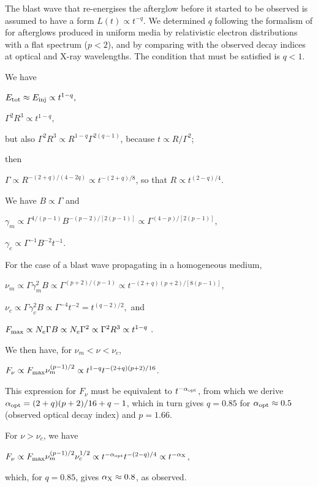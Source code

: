\documentclass[fleqn,usenatbib]{mnras}
\begin{document}
The blast wave that re-energises the afterglow before it started to be observed is assumed to have a form $L(t) \propto t^{-q}$. We determined $q$ following the formalism of  \citep{Dai01} for afterglows produced  in uniform media by relativistic electron distributions with a flat spectrum ($p < 2$), and by comparing with the observed decay indices at optical and X-ray wavelengths. The condition that must be satisfied is $q < 1$.  

We have

$E_{\rm tot} \approx E_{\rm inj} \propto t^{1 - q},$

$\Gamma^2 R^3 \propto t^{1 - q},$

\noindent
but also $\Gamma^2 R^3 \propto R^{1 - q} \Gamma^{2(q - 1)}$, because $t \propto R/\Gamma^2$;

\noindent
then

$\Gamma \propto R^{-(2+q)/(4-2q)} \propto t^{-(2+q)/8}$, so that $R \propto t^{(2-q)/4}$.

\noindent
We have $B \propto \Gamma$ and

$\gamma_m \propto \Gamma^{1/(p-1)} B^{-(p-2)/[2(p-1)]} \propto \Gamma^{(4-p)/[2(p-1)]}$,

$\gamma_c \propto \Gamma^{-1} B^{-2} t^{-1}$.

\noindent
For the case of a blast wave propagating in a homogeneous medium,

$\nu_m \propto \Gamma \gamma_m^2 B \propto \Gamma^{(p+2)/(p-1)} \propto t^{-(2+q)(p+2)/[8(p-1)]},$

$\nu_c \propto \Gamma \gamma_c^2 B \propto \Gamma^{-4} t^{-2} = t^{(q-2)/2},$ and

$F_{\rm max} \propto N_e \Gamma B \propto N_e \Gamma^2 \propto \Gamma^2 R^3 \propto t^{1 - q}$ .

\noindent
We then have, for $\nu_m < \nu < \nu_c$,

$F_{\nu} \propto F_{\rm max} \nu_m^{(p-1)/2} \propto t^{1 - q} t^{-(2+q)(p+2)/16}$.

\noindent
This expression for $F_{\nu}$ must be equivalent to $t^{-\alpha_{\rm opt}}$, 
from which we derive $\alpha_{\rm opt} = (2+q)(p+2)/16 + q - 1$, which in turn gives $q = 0.85$ for $\alpha_{\rm opt} \approx 0.5$ (observed optical decay index) and $p = 1.66$.

For $\nu > \nu_c$, we have 

$F_{\nu} \propto F_{\rm max} \nu_m^{(p-1)/2} \nu_c^{1/2} \propto t^{-\alpha_{\rm opt}} t^{-(2-q)/4} \propto t^{-\alpha_{\rm X}}$,

\noindent
which, for $q = 0.85$, gives $\alpha_{\rm X} \approx 0.8$, as observed.



\bsp	%
\label{lastpage}
\end{document}
